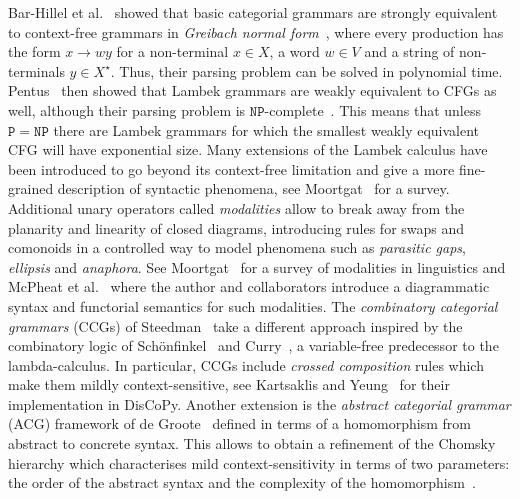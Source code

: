 Bar-Hillel et al.~\cite{Bar-HillelEtAl60} showed that basic categorial grammars are strongly equivalent to context-free grammars in \emph{Greibach normal form}~\cite{Greibach65}, where every production has the form $x \to w y$ for a non-terminal $x \in X$, a word $w \in V$ and a string of non-terminals $y \in X^\star$.
Thus, their parsing problem can be solved in polynomial time.
Pentus~\cite{Pentus93} then showed that Lambek grammars are weakly equivalent to CFGs as well, although their parsing problem is $\mathtt{NP}$-complete~\cite{Pentus06}.
This means that unless $\mathtt{P} = \mathtt{NP}$ there are Lambek grammars for which the smallest weakly equivalent CFG will have exponential size.
Many extensions of the Lambek calculus have been introduced to go beyond its context-free limitation and give a more fine-grained description of syntactic phenomena, see Moortgat~\cite{Moortgat14} for a survey.
Additional unary operators called \emph{modalities} allow to break away from the planarity and linearity of closed diagrams, introducing rules for swaps and comonoids in a controlled way to model phenomena such as \emph{parasitic gaps}, \emph{ellipsis} and \emph{anaphora}.
See Moortgat~\cite[4.2]{Moortgat97} for a survey of modalities in linguistics and McPheat et al.~\cite{McPheatEtAl21} where the author and collaborators introduce a diagrammatic syntax and functorial semantics for such modalities.
The \emph{combinatory categorial grammars} (CCGs) of Steedman~\cite{Steedman87,Steedman00} take a different approach inspired by the combinatory logic of Schönfinkel~\cite{Schonfinkel24} and Curry~\cite{Curry30}, a variable-free predecessor to the lambda-calculus.
In particular, CCGs include \emph{crossed composition} rules which make them mildly context-sensitive, see Kartsaklis and Yeung~\cite{YeungKartsaklis21} for their implementation in DisCoPy.
Another extension is the \emph{abstract categorial grammar} (ACG) framework of de Groote~\cite{Groote01} defined in terms of a homomorphism from abstract to concrete syntax.
This allows to obtain a refinement of the Chomsky hierarchy which characterises mild context-sensitivity in terms of two parameters: the order of the abstract syntax and the complexity of the homomorphism~\cite{DeGrootePogodalla04}.

